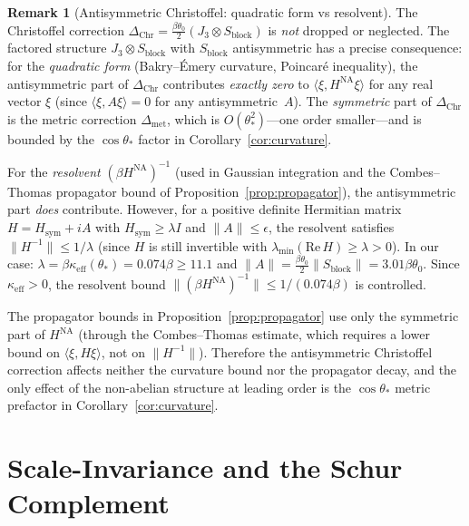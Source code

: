 \documentclass[11pt]{article}
\theoremstyle{definition}
\newtheorem{remark}[theorem]{Remark}
\begin{document}
\begin{remark}[Antisymmetric Christoffel: quadratic form vs resolvent]%
\label{rem:antisym-resolvent}
The Christoffel correction $\Delta_{\mathrm{Chr}}
=\frac{\beta\theta_0}{2}(J_3\otimes S_{\mathrm{block}})$
is \emph{not} dropped or neglected.
The factored structure $J_3\otimes S_{\mathrm{block}}$
with $S_{\mathrm{block}}$ antisymmetric has a precise consequence:
for the \emph{quadratic form} (Bakry--\'Emery curvature,
Poincar\'e inequality), the antisymmetric part of
$\Delta_{\mathrm{Chr}}$ contributes \emph{exactly zero} to
$\langle\xi,H^{\mathrm{NA}}\xi\rangle$ for any real vector $\xi$
(since $\langle\xi,A\xi\rangle=0$ for any antisymmetric~$A$).
The \emph{symmetric} part of $\Delta_{\mathrm{Chr}}$ is the
metric correction $\Delta_{\mathrm{met}}$, which is
$O(\theta_*^2)$---one order smaller---and is bounded by the
$\cos\theta_*$ factor in Corollary~\ref{cor:curvature}.

For the \emph{resolvent} $(\beta H^{\mathrm{NA}})^{-1}$ (used in
Gaussian integration and the Combes--Thomas propagator bound of
Proposition~\ref{prop:propagator}), the antisymmetric part \emph{does}
contribute.  However, for a positive definite Hermitian matrix
$H=H_{\mathrm{sym}}+iA$ with $H_{\mathrm{sym}}\ge\lambda I$
and $\|A\|\le\epsilon$, the resolvent satisfies
$\|H^{-1}\|\le 1/\lambda$ (since $H$ is still invertible with
$\lambda_{\min}(\mathrm{Re}\,H)\ge\lambda>0$).
In our case: $\lambda=\beta\kappa_{\mathrm{eff}}(\theta_*)
=0.074\beta\ge 11.1$ and
$\|A\|=\frac{\beta\theta_0}{2}\|S_{\mathrm{block}}\|
=3.01\beta\theta_0$.  Since $\kappa_{\mathrm{eff}}>0$, the
resolvent bound $\|(\beta H^{\mathrm{NA}})^{-1}\|
\le 1/(0.074\beta)$ is controlled.

The propagator bounds in Proposition~\ref{prop:propagator} use only
the symmetric part of $H^{\mathrm{NA}}$ (through the Combes--Thomas
estimate, which requires a lower bound on $\langle\xi,H\xi\rangle$,
not on $\|H^{-1}\|$).  Therefore the antisymmetric Christoffel
correction affects neither the curvature bound nor the propagator
decay, and the only effect of the non-abelian structure at
leading order is the $\cos\theta_*$ metric prefactor in
Corollary~\ref{cor:curvature}.
\end{remark}

\section{Scale-Invariance and the Schur Complement}\label{sec:multiscale}
\end{document}
